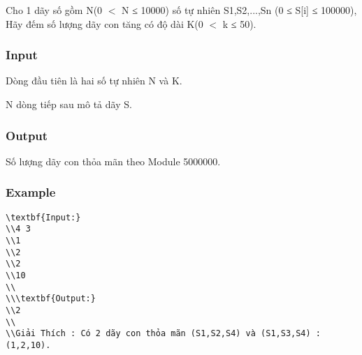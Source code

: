 



   Cho 1 dãy số gồm N(0 $<$ N ≤ 10000) số tự nhiên S1,S2,...,Sn (0 ≤ S[i] ≤ 100000), Hãy đếm số lượng dãy con tăng có độ dài K(0 $<$ k ≤ 50).  

\subsubsection{   Input  }

   Dòng đầu tiên là hai số tự nhiên N và K.  

   N dòng tiếp sau mô tả dãy S.  

\subsubsection{   Output  }

   Số lượng dãy con thỏa mãn theo Module 5000000.  

\subsubsection{   Example  }
\begin{verbatim}
\textbf{Input:}
\\4 3
\\1
\\2
\\2
\\10
\\
\\\textbf{Output:}
\\2
\\
\\Giải Thích : Có 2 dãy con thỏa mãn (S1,S2,S4) và (S1,S3,S4) : (1,2,10).\end{verbatim}